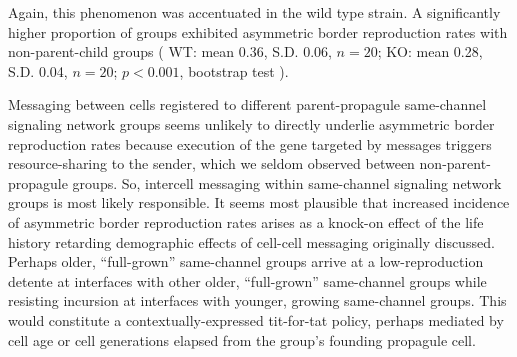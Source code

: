 Again, this phenomenon was accentuated in the wild type strain.
A significantly higher proportion of groups exhibited asymmetric border reproduction rates with non-parent-child groups
(%
WT: mean 0.36, S.D. 0.06, $n=20$;
KO: mean 0.28, S.D. 0.04, $n=20$;
$p < 0.001$, bootstrap test%
). %

Messaging between cells registered to different parent-propagule same-channel signaling network groups seems unlikely to directly underlie asymmetric border reproduction rates because execution of the gene targeted by messages triggers resource-sharing to the sender, which we seldom observed between non-parent-propagule groups.
So, intercell messaging within same-channel signaling network groups is most likely responsible.
It seems most plausible that increased incidence of asymmetric border reproduction rates arises as a knock-on effect of the life history retarding demographic effects of cell-cell messaging originally discussed.
Perhaps older, ``full-grown'' same-channel groups arrive at a low-reproduction detente at interfaces with other older, ``full-grown'' same-channel groups while resisting incursion at interfaces with younger, growing same-channel groups.
This would constitute a contextually-expressed tit-for-tat policy, perhaps mediated by cell age or cell generations elapsed from the group's founding propagule cell.
